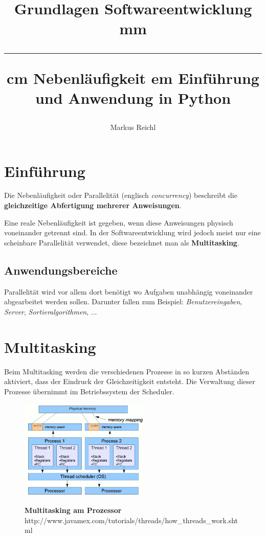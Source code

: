 \documentclass[a4paper,11pt]{article}
\title{
  \Large{Grundlagen Softwareentwicklung} \vskip 2 mm
  \hrule \vskip 1.2 cm
  \Huge{Nebenl\"aufigkeit} \vskip 0.5 em
  \large{Einf\"uhrung und Anwendung in Python}}
\author{Markus Reichl}
\begin{document}
\maketitle

\tableofcontents

\section{Einf\"uhrung}
\begin{flushleft}
Die Nebenl\"aufigkeit oder Parallelit\"at (englisch \textit{concurrency}) beschreibt die \textbf{gleichzeitige Abfertigung mehrerer Anweisungen}.
\end{flushleft}
Eine reale Nebenl\"aufigkeit ist gegeben, wenn diese Anweisungen physisch voneinander getrennt sind.
In der Softwareentwicklung wird jedoch meist nur eine scheinbare Parallelit\"at verwendet, diese bezeichnet man als \textbf{Multitasking}.

\subsection{Anwendungsbereiche}
Parallelit\"at wird vor allem dort ben\"otigt wo Aufgaben unabh\"angig voneinander abgearbeitet werden sollen.
Darunter fallen zum Beispiel: \textit{Benutzereingaben}, \textit{Server}, \textit{Sortieralgorithmen}, ...

\newpage

\section{Multitasking}

Beim Multitasking werden die verschiedenen Prozesse in so kurzen Abst\"anden aktiviert, dass der Eindruck der Gleichzeitigkeit entsteht.
Die Verwaltung dieser Prozesse \"ubernimmt im Betriebssystem der Scheduler.

\begin{figure}[ht]
\centering
\includegraphics[width=0.55\textwidth]{imgs/ThreadDiagram.png}

\tiny{\textbf{Multitasking am Prozessor}\\ http://www.javamex.com/tutorials/threads/how\_threads\_work.shtml}
\end{figure}
\end{document}
